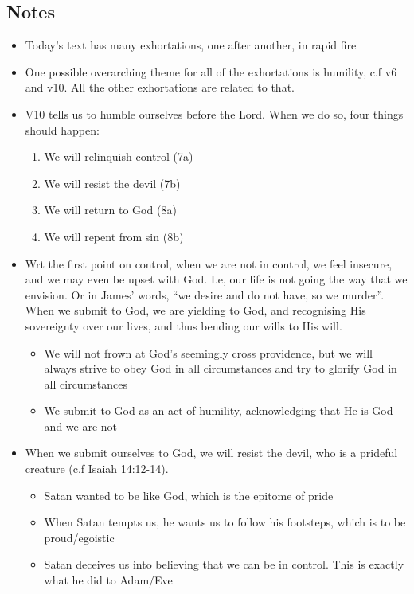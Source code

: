 \subsection*{Notes}
\begin{itemize}
  \item Today’s text has many exhortations, one after another, in rapid fire
  \item One possible overarching theme for all of the exhortations is humility, c.f v6 and v10. All the other exhortations are related to that.
  \item V10 tells us to humble ourselves before the Lord. When we do so, four things should happen:
    \begin{enumerate}
      \item We will relinquish control (7a)
      \item We will resist the devil (7b)
      \item We will return to God (8a)
      \item We will repent from sin (8b)
    \end{enumerate}
  \item Wrt the first point on control, when we are not in control, we feel insecure, and we may even be upset with God. I.e, our life is not going the way that we envision. Or in James’ words, “we desire and do not have, so we murder”. When we submit to God, we are yielding to God, and recognising His sovereignty over our lives, and thus bending our wills to His will. 
  \begin{itemize}
    \item We will not frown at God’s seemingly cross providence, but we will always strive to obey God in all circumstances and try to glorify God in all circumstances
    \item We submit to God as an act of humility, acknowledging that He is God and we are not
  \end{itemize}
  \item When we submit ourselves to God, we will resist the devil, who is a prideful creature (c.f Isaiah 14:12-14).
  \begin{itemize}
    \item Satan wanted to be like God, which is the epitome of pride 
    \item When Satan tempts us, he wants us to follow his footsteps, which is to be proud/egoistic 
    \item Satan deceives us into believing that we can be in control. This is exactly what he did to Adam/Eve 

\end{itemize}
\end{itemize}
